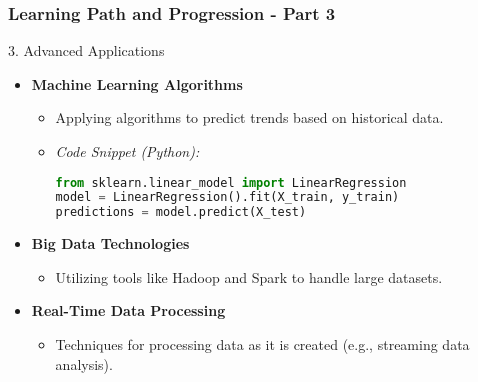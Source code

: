 \documentclass[aspectratio=169]{beamer}
\begin{document}
\begin{frame}[fragile]
    \frametitle{Learning Path and Progression - Part 3}
    \begin{block}{3. Advanced Applications}
        \begin{itemize}
            \item \textbf{Machine Learning Algorithms}
                \begin{itemize}
                    \item Applying algorithms to predict trends based on historical data.
                    \item \textit{Code Snippet (Python):}
                    \begin{lstlisting}[language=Python]
from sklearn.linear_model import LinearRegression
model = LinearRegression().fit(X_train, y_train)
predictions = model.predict(X_test)
                    \end{lstlisting}
                \end{itemize}

            \item \textbf{Big Data Technologies}
                \begin{itemize}
                    \item Utilizing tools like Hadoop and Spark to handle large datasets.
                \end{itemize}

            \item \textbf{Real-Time Data Processing}
                \begin{itemize}
                    \item Techniques for processing data as it is created (e.g., streaming data analysis).
                \end{itemize}
        \end{itemize}
    \end{block}
\end{frame}
\end{document}
